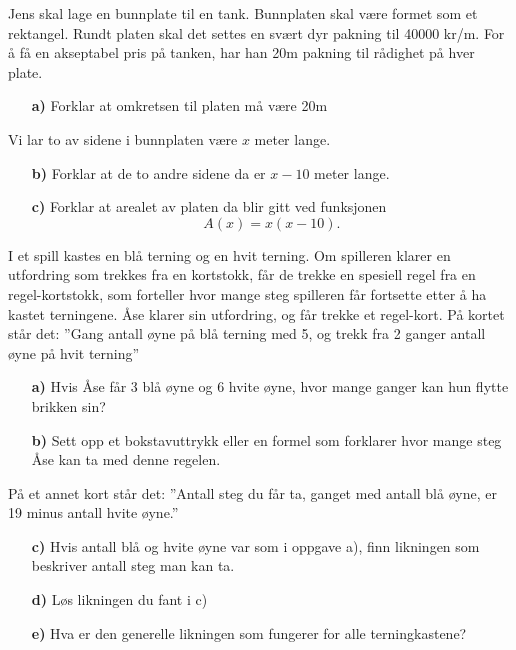 \documentclass[a4, 11pt, twoside]{article}
\theoremstyle{definition}
\begin{document}
\begin{Exercise}
Jens skal lage en bunnplate til en tank. Bunnplaten skal være
formet som et rektangel.
Rundt platen skal det settes en svært dyr
pakning til 40000 kr/m. For å få en akseptabel pris på
tanken, har han 20m pakning til rådighet på hver plate.
\begin{itemize}
  \item[\bf a)] Forklar at omkretsen til platen må være 20m
\end{itemize}
Vi lar to av sidene i bunnplaten være $x$ meter lange.
\begin{itemize}
  \item[\bf b)] Forklar at de to andre sidene da er $x - 10$ meter
    lange.
  \item[\bf c)] Forklar at arealet av platen da blir gitt ved funksjonen
    \[ A(x) = x(x - 10). \]
\end{itemize}
\end{Exercise}


\begin{Exercise}
  I et spill kastes en blå terning og en hvit terning. Om spilleren
  klarer en utfordring som trekkes fra en kortstokk, får de trekke
  en spesiell regel fra en regel-kortstokk, som forteller
  hvor mange steg spilleren får fortsette etter å ha kastet
  terningene.\newline
  Åse klarer sin utfordring, og får trekke et regel-kort.
      På kortet står det: ''Gang antall øyne på blå terning med 5,
      og trekk fra 2 ganger antall øyne på hvit terning''
  \begin{itemize}
    \item[\bf a)] Hvis Åse får 3 blå øyne og 6 hvite øyne, hvor mange
      ganger kan hun flytte brikken sin?
    \item[\bf b)] Sett opp et bokstavuttrykk eller en formel som
      forklarer hvor mange steg Åse kan ta med denne regelen.
  \end{itemize}
  På et annet kort står det: \newline
    ''Antall steg du får ta, ganget med antall blå øyne, er 
    19 minus antall hvite øyne.''
  \begin{itemize}
    \item[\bf c)] Hvis antall blå og hvite øyne var som i oppgave a),
      finn likningen som beskriver antall steg man kan ta.
    \item[\bf d)] Løs likningen du fant i c)
    \item[\bf e)] Hva er den generelle likningen som fungerer for alle
      terningkastene?
  \end{itemize}
\end{Exercise}
\end{document}

